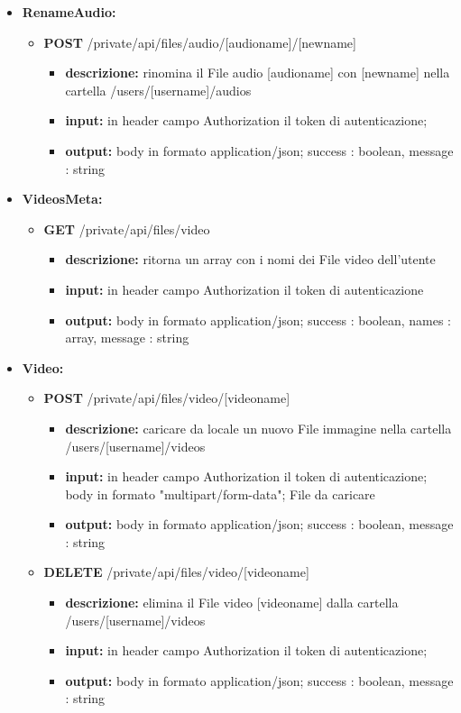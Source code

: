 {{\begin{itemize}
		\item \textbf{RenameAudio:}
			\begin{itemize}
			\item   \textbf{POST} /private/api/files/audio/[audioname]/[newname] 
				\begin{itemize} 
				\item \textbf{descrizione:} rinomina il File audio [audioname] con [newname] nella cartella /users/[username]/audios
				\item \textbf{input:} in header campo Authorization il token di autenticazione;
				\item \textbf{output:} body in formato application/json; success : boolean, message : string
				\end{itemize}
			\end{itemize}
						
		\item \textbf{VideosMeta:}
			\begin{itemize}
			\item   \textbf{GET} /private/api/files/video
				\begin{itemize} 
				\item \textbf{descrizione:} ritorna un array con i nomi dei File video dell'utente
				\item \textbf{input:} in header campo Authorization il token di autenticazione
				\item \textbf{output:} body in formato application/json; success : boolean, names : array, message : string
				\end{itemize}
			\end{itemize}
			
		\item \textbf{Video:}
			\begin{itemize}
			\item    \textbf{POST} /private/api/files/video/[videoname]
				\begin{itemize} 
				\item \textbf{descrizione:} caricare da locale un nuovo File immagine nella cartella /users/[username]/videos					
				\item \textbf{input:} in header campo Authorization il token di autenticazione; body in formato "multipart/form-data"; File da caricare
				\item \textbf{output:} body in formato application/json; success : boolean, message : string
				\end{itemize}
			\item   \textbf{DELETE} /private/api/files/video/[videoname]
				\begin{itemize} 
				\item \textbf{descrizione:} elimina il File video [videoname] dalla cartella /users/[username]/videos			
				\item \textbf{input:} in header campo Authorization il token di autenticazione;
				\item \textbf{output:} body in formato application/json; success : boolean, message : string
				\end{itemize}
			\end{itemize}
			

\end{itemize}}}
